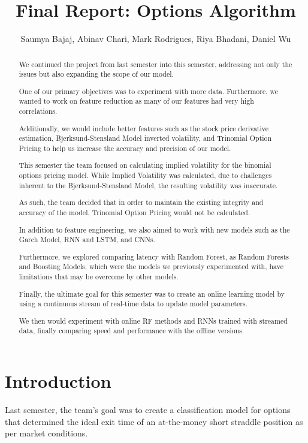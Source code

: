 \documentclass[11pt]{article}
\title{Final Report: Options Algorithm }
\author{Saumya Bajaj, Abinav Chari, Mark Rodrigues, Riya Bhadani, Daniel Wu}
\begin{document}
\maketitle
\begin{abstract}
We continued the project from last semester into this semester, addressing not only the issues but also expanding the scope of our model.

One of our primary objectives was to experiment with more data. Furthermore, we wanted to work on feature reduction as many of our features had very high correlations.

Additionally, we would include better features such as the stock price derivative estimation, Bjerksund-Stensland Model inverted volatility, and Trinomial Option Pricing to help us increase the accuracy and precision of our model.

This semester the team focused on calculating implied volatility for the binomial options pricing model. While Implied Volatility was calculated, due to challenges inherent to the Bjerksund-Stensland Model, the resulting volatility was inaccurate.

As such, the team decided that in order to maintain the existing integrity and accuracy of the model, Trinomial Option Pricing would not be calculated.

In addition to feature engineering, we also aimed to work with new models such as the Garch Model, RNN and LSTM, and CNNs. 

Furthermore, we explored comparing latency with Random Forest, as Random Forests and Boosting Models, which were the models we previously experimented with, have limitations that may be overcome by other models.

Finally, the ultimate goal for this semester was to create an online learning model by using a continuous stream of real-time data to update model parameters. 

We then would experiment with online RF methods and RNNs trained with streamed data, finally comparing speed and performance with the offline versions.

\end{abstract}

\section{Introduction}

Last semester, the team’s goal was to create a classification model for options that determined  the ideal exit time of an at-the-money short straddle position as per market conditions. 
\end{document}
